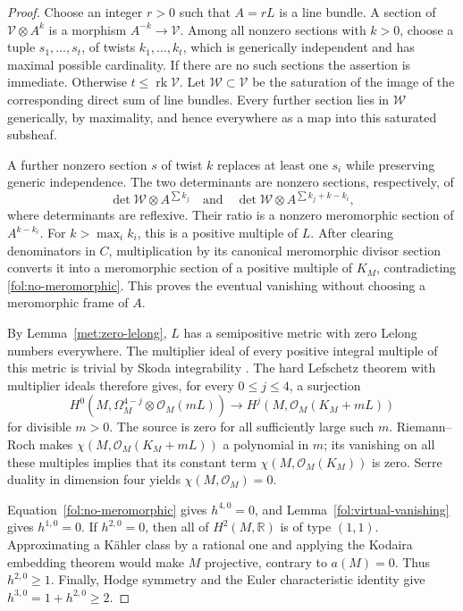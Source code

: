 \documentclass[11pt,letterpaper]{article}
\newcommand{\R}{\mathbb{R}}
\newcommand{\OO}{\mathcal{O}}
\DeclareMathOperator{\rk}{rk}
\theoremstyle{definition}
\theoremstyle{remark}
\begin{document}
\begin{proof}
Choose an integer $r>0$ such that $A=rL$ is a line bundle.  A section of
$\mathcal V\otimes A^k$ is a morphism $A^{-k}\to\mathcal V$.  Among
all nonzero sections with $k>0$, choose a tuple
$s_1,\ldots,s_t$, of twists $k_1,\ldots,k_t$, which is generically
independent and has maximal possible cardinality.  If there are no such
sections the assertion is immediate.  Otherwise $t\leq\rk\mathcal V$.
Let $\mathcal W\subset\mathcal V$ be the saturation of the image of the
corresponding direct sum of line bundles.  Every further section lies in
$\mathcal W$ generically, by maximality, and hence everywhere as a map
into this saturated subsheaf.

A further nonzero section $s$ of twist $k$ replaces at least one $s_i$
while preserving generic independence.  The two determinants are nonzero
sections, respectively, of
\[
 \det\mathcal W\otimes A^{\sum k_j}
 \quad\text{and}\quad
 \det\mathcal W\otimes A^{\sum k_j+k-k_i},
\]
where determinants are reflexive.  Their ratio is a nonzero meromorphic
section of $A^{k-k_i}$.  For $k>\max_i k_i$, this is a positive multiple
of $L$.  After clearing denominators in $C$, multiplication by its
canonical meromorphic divisor section converts it into a meromorphic
section of a positive multiple of $K_M$, contradicting
\eqref{fol:no-meromorphic}.  This proves the eventual vanishing without
choosing a meromorphic frame of $A$.

By Lemma~\ref{met:zero-lelong}, $L$ has a semipositive metric with zero
Lelong numbers everywhere.  The multiplier ideal of every positive
integral multiple of this metric is trivial by Skoda integrability
\cite{SkodaIntegrability}.  The hard Lefschetz theorem with multiplier
ideals \cite[Theorem~0.1]{DPSHardLefschetz} therefore gives, for every
$0\leq j\leq4$, a surjection
\[
 H^0(M,\Omega_M^{4-j}\otimes\OO_M(mL))
 \longrightarrow H^j(M,\OO_M(K_M+mL))
\]
for divisible $m>0$.  The source is zero for all sufficiently large such
$m$.  Riemann--Roch makes $\chi(M,\OO_M(K_M+mL))$ a polynomial in $m$;
its vanishing on all these multiples implies that its constant term
$\chi(M,\OO_M(K_M))$ is zero.  Serre duality in dimension four yields
$\chi(M,\OO_M)=0$.

Equation~\eqref{fol:no-meromorphic} gives $h^{4,0}=0$, and
Lemma~\ref{fol:virtual-vanishing} gives $h^{1,0}=0$.  If $h^{2,0}=0$,
then all of $H^2(M,\R)$ is of type $(1,1)$.  Approximating a K\"ahler
class by a rational one and applying the Kodaira embedding theorem would
make $M$ projective, contrary to $a(M)=0$.  Thus $h^{2,0}\geq1$.
Finally, Hodge symmetry and the Euler characteristic identity give
$h^{3,0}=1+h^{2,0}\geq2$.
\end{proof}
\end{document}
